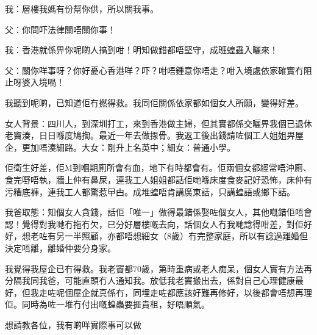 我：層樓我媽有份幫你供，所以關我事。

父：你問吓法律關唔關你事！

我：香港就係畀你呢啲人搞到咁！明知做錯都唔堅守，成班蝗蟲入曬來！

父：關你咩事呀？你好憂心香港咩？吓？咁唔鍾意你唔走？咁入境處依家確實冇阻止呀婆入境喎！

我聽到呢啲，已知道佢冇撚得救。我同佢關係依家都如個女人所願，變得好差。

女人背景：四川人，到深圳打工，來到香港做主婦，但其實都係交曬畀我個已退休老竇湊，日日喺度鳩揈。最近一年去做揼骨。我返工後出錢請咗個工人姐姐畀屋企，更加唔湊細路。大女：剛升上名英中；細女：普通小學。

佢衛生好差，佢M到嗰期廁所會有血，地下有時都會有。佢兩個女都經常唔沖廁、食完嘢唔執，牆上仲有鼻屎，連我工人姐姐都話佢哋喺床度食麥記好恐怖，床仲有污糟底褲，連我工人都驚惹曱甴。成堆蝗唔肯講廣東話，只講蝗語或鄉下話。

我爸取態：知個女人貪錢，話佢「唯一」做得最錯係娶咗個女人，其他嘅錯佢唔會認！覺得對我哋冇拖冇欠，已分好層樓嘅去向，話個女人冇我哋諗得咁差，對佢好好，想老咗有另一半照顧，亦都唔想細女（8歲）冇完整家庭，所以有諗過離婚但決定唔離，離婚仲要分身家。

我覺得我屋企已冇得救。我老竇都70歲，第時重病或老人痴呆，個女人實有方法再分隔我同我爸，可能直頭冇人通知我。放低我老竇搬出去，係對自己心理健康最好，但我走咗呢個屋企就真係冇，同埋走咗都應該好難再修好，以後都會唔想再理佢。同時為咗一堆冇付出嘅蝗蟲要捱貴租，好唔順氣。

想請教各位，我有啲咩實際事可以做

